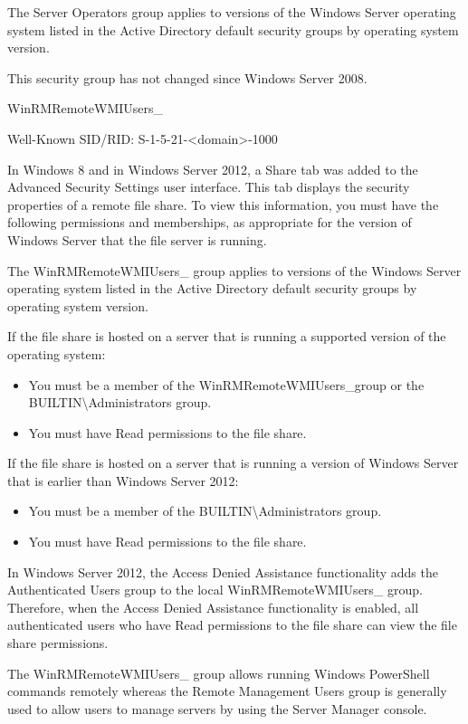 The Server Operators group applies to versions of the Windows Server operating system listed in the Active Directory default security groups by operating system version.

This security group has not changed since Windows Server 2008.

WinRMRemoteWMIUsers\_

Well-Known SID/RID: S-1-5-21-<domain>-1000

In Windows 8 and in Windows Server 2012, a Share tab was added to the Advanced Security Settings user interface. This tab displays the security properties of a remote file share. To view this information, you must have the following permissions and memberships, as appropriate for the version of Windows Server that the file server is running.

The WinRMRemoteWMIUsers\_ group applies to versions of the Windows Server operating system listed in the Active Directory default security groups by operating system version.

If the file share is hosted on a server that is running a supported version of the operating system:

\begin{itemize}
    \item You must be a member of the WinRMRemoteWMIUsers\_group or the BUILTIN\textbackslash{}Administrators group.
    \item You must have Read permissions to the file share.
\end{itemize}
If the file share is hosted on a server that is running a version of Windows Server that is earlier than Windows Server 2012:

\begin{itemize}
    \item You must be a member of the BUILTIN\textbackslash{}Administrators group.
    \item You must have Read permissions to the file share.
\end{itemize}
In Windows Server 2012, the Access Denied Assistance functionality adds the Authenticated Users group to the local WinRMRemoteWMIUsers\_ group. Therefore, when the Access Denied Assistance functionality is enabled, all authenticated users who have Read permissions to the file share can view the file share permissions.

The WinRMRemoteWMIUsers\_ group allows running Windows PowerShell commands remotely whereas the Remote Management Users group is generally used to allow users to manage servers by using the Server Manager console.

